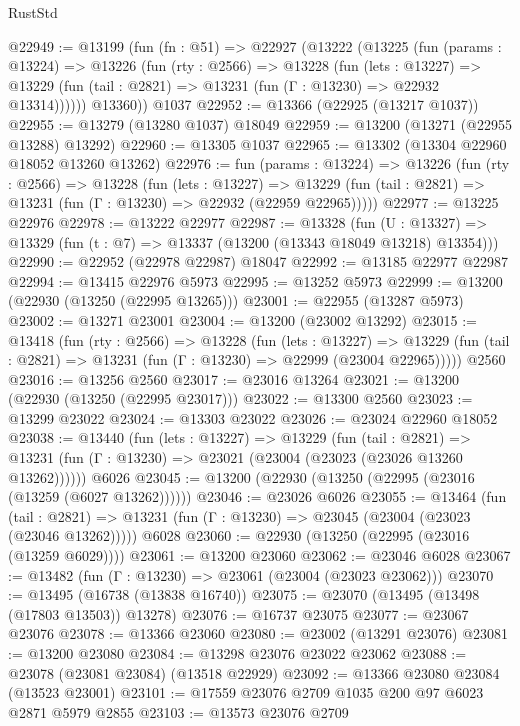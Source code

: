 \begin{lexlean}{RustStd}
\begin{coremodule}
@22949 := @13199
    (fun (fn : @51) =>
    @22927
      (@13222
        (@13225
          (fun (params : @13224) =>
          @13226
            (fun (rty : @2566) =>
            @13228
              (fun (lets : @13227) =>
              @13229 (fun (tail : @2821) => @13231 (fun (Γ : @13230) => @22932 @13314))))))
        @13360))
    @1037
@22952 := @13366 (@22925 (@13217 @1037))
@22955 := @13279 (@13280 @1037) @18049
@22959 := @13200 (@13271 (@22955 @13288) @13292)
@22960 := @13305 @1037
@22965 := @13302 (@13304 @22960 @18052 @13260 @13262)
@22976 := fun (params : @13224) =>
  @13226
    (fun (rty : @2566) =>
    @13228
      (fun (lets : @13227) =>
      @13229 (fun (tail : @2821) => @13231 (fun (Γ : @13230) => @22932 (@22959 @22965)))))
@22977 := @13225 @22976
@22978 := @13222 @22977
@22987 := @13328
    (fun (U : @13327) => @13329 (fun (t : @7) => @13337 (@13200 (@13343 @18049 @13218) @13354)))
@22990 := @22952 (@22978 @22987) @18047
@22992 := @13185 @22977 @22987
@22994 := @13415 @22976 @5973
@22995 := @13252 @5973
@22999 := @13200 (@22930 (@13250 (@22995 @13265)))
@23001 := @22955 (@13287 @5973)
@23002 := @13271 @23001
@23004 := @13200 (@23002 @13292)
@23015 := @13418
    (fun (rty : @2566) =>
    @13228
      (fun (lets : @13227) =>
      @13229 (fun (tail : @2821) => @13231 (fun (Γ : @13230) => @22999 (@23004 @22965)))))
    @2560
@23016 := @13256 @2560
@23017 := @23016 @13264
@23021 := @13200 (@22930 (@13250 (@22995 @23017)))
@23022 := @13300 @2560
@23023 := @13299 @23022
@23024 := @13303 @23022
@23026 := @23024 @22960 @18052
@23038 := @13440
    (fun (lets : @13227) =>
    @13229
      (fun (tail : @2821) =>
      @13231 (fun (Γ : @13230) => @23021 (@23004 (@23023 (@23026 @13260 @13262))))))
    @6026
@23045 := @13200 (@22930 (@13250 (@22995 (@23016 (@13259 (@6027 @13262))))))
@23046 := @23026 @6026
@23055 := @13464
    (fun (tail : @2821) => @13231 (fun (Γ : @13230) => @23045 (@23004 (@23023 (@23046 @13262)))))
    @6028
@23060 := @22930 (@13250 (@22995 (@23016 (@13259 @6029))))
@23061 := @13200 @23060
@23062 := @23046 @6028
@23067 := @13482 (fun (Γ : @13230) => @23061 (@23004 (@23023 @23062)))
@23070 := @13495 (@16738 (@13838 @16740))
@23075 := @23070 (@13495 (@13498 (@17803 @13503)) @13278)
@23076 := @16737 @23075
@23077 := @23067 @23076
@23078 := @13366 @23060
@23080 := @23002 (@13291 @23076)
@23081 := @13200 @23080
@23084 := @13298 @23076 @23022 @23062
@23088 := @23078 (@23081 @23084) (@13518 @22929)
@23092 := @13366 @23080 @23084 (@13523 @23001)
@23101 := @17559 @23076 @2709 @1035 @200 @97 @6023 @2871 @5979 @2855
@23103 := @13573 @23076 @2709

\end{coremodule}
\end{lexlean}
